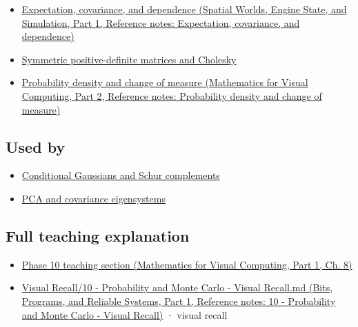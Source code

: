 \begin{itemize}
\tightlist
\item
  \href{../05-Spatial-Worlds-Engine-State-and-Simulation-P01/main.pdf\#nameddest=appendix-54c383df9992}{Expectation, covariance, and dependence (Spatial Worlds, Engine State, and Simulation, Part 1, Reference notes: Expectation, covariance, and dependence)}
\item
  \hyperref[appendix-50d2ea3c9b26]{Symmetric positive-definite matrices and Cholesky}
\item
  \href{../02-Mathematics-for-Visual-Computing-P02/main.pdf\#nameddest=appendix-4815cd87ab8b}{Probability density and change of measure (Mathematics for Visual Computing, Part 2, Reference notes: Probability density and change of measure)}
\end{itemize}

\subsection{Used by}\label{appendix-12bbe185dbe5-used-by}

\hypertarget{appendix-12bbe185dbe5-used-by}{}

\begin{itemize}
\tightlist
\item
  \hyperref[appendix-f0437ea55a47]{Conditional Gaussians and Schur complements}
\item
  \hyperref[appendix-ad175ef3c5bf]{PCA and covariance eigensystems}
\end{itemize}

\subsection{Full teaching explanation}\label{appendix-12bbe185dbe5-full-teaching-explanation}

\hypertarget{appendix-12bbe185dbe5-full-teaching-explanation}{}

\begin{itemize}
\tightlist
\item
  \href{../02-Mathematics-for-Visual-Computing-P01/main.pdf\#nameddest=02-foundations-ii-ch024-waiting-times-event-counts-and-covariance-geometry}{Phase 10 teaching section (Mathematics for Visual Computing, Part 1, Ch. 8)}
\item
  \href{../01-Bits-Programs-and-Reliable-Systems-P01/main.pdf\#nameddest=appendix-cb5af353ef77}{Visual Recall/10 - Probability and Monte Carlo - Visual Recall.md (Bits, Programs, and Reliable Systems, Part 1, Reference notes: 10 - Probability and Monte Carlo - Visual Recall)} · visual recall
\end{itemize}

